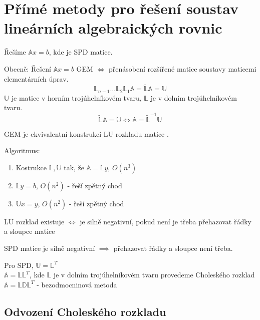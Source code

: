 \documentclass[../main.tex]{subfiles}
\begin{document}
\section{Přímé metody pro řešení soustav lineárních algebraických rovnic}
Řešíme $\mathbb{A}x = b$, kde \matA je SPD matice.

Obecně: Řešení $\mathbb{A}x = b$ GEM $\Leftrightarrow$ přenásobení rozšířené matice soustavy maticemi 
elementárních úprav. 
\begin{equation*}
    \mathbb{L}_{n-1}\dots\mathbb{L}_{2}\mathbb{L}_{1}\mathbb{A} = \tilde{\mathbb{L}}\mathbb{A} = \mathbb{U}
\end{equation*}
$\mathbb{U}$ je matice v horním trojúhelníkovém tvaru, $\mathbb{L}$ je v dolním trojúhelníkovém tvaru.
\begin{equation*}
    \tilde{\mathbb{L}}\mathbb{A}=\mathbb{U} \Leftrightarrow \mathbb{A} = \tilde{\mathbb{L}}^{-1}\mathbb{U}
\end{equation*}

GEM je ekvivalentní konstrukci LU rozkladu matice \matA .

Algoritmus:
\begin{enumerate}
    \item Kostrukce $\mathbb{L}, \mathbb{U}$ tak, že $\mathbb{A} = \mathbb{L} y$, $O(n^3)$
    \item $\mathbb{L} y = b$, $O(n^2)$ - řeší zpětný chod
    \item $\mathbb{U} x = y$, $O(n^2)$ - řeší zpětný chod
\end{enumerate}


LU rozklad existuje $\Leftrightarrow$ \matA je silně negativní, pokud není je třeba přehazovat
řádky a sloupce matice \matA

SPD matice je silně negativní $\implies$ přehazovat řádky a sloupce není třeba.




Pro \matA SPD, $\mathbb{U} = \mathbb{L}^T$\\
$\mathbb{A} = \mathbb{L}\mathbb{L}^T$, kde $\mathbb{L}$ je v dolním trojúhelníkovém tvaru provedeme Choleského rozklad\\
$\mathbb{A} = \mathbb{L}\mathbb{D}\mathbb{L}^T$ - bezodmocninová metoda 





\subsection{Odvození Choleského rozkladu}
\end{document}
